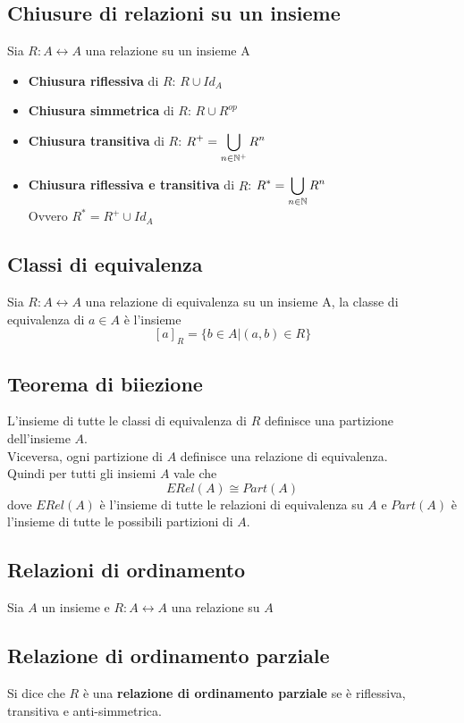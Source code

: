 \documentclass{article}
\begin{document}
\subsection*{Chiusure di relazioni su un insieme}
Sia \(R: A \leftrightarrow A\) una relazione su un insieme A
\begin{itemize}
    \item \textbf{Chiusura riflessiva} di \(R\): \(R \cup Id_A\)
    \item \textbf{Chiusura simmetrica} di \(R\): \(R \cup R^{op}\)
    \item \textbf{Chiusura transitiva} di \(R\): \(\displaystyle R^+ = \bigcup_{n \in \mathbb{N}^+} R^n\)
    \item \textbf{Chiusura riflessiva e transitiva} di \(R\): \(\displaystyle R^* = \bigcup_{n \in \mathbb{N}} R^n\) \\
          Ovvero \(R^* = R^+ \cup Id_A\)
\end{itemize}
\subsection*{Classi di equivalenza}
Sia \(R: A \leftrightarrow A\) una relazione di equivalenza su un insieme A, la classe di equivalenza di \(a \in A\) è l'insieme
\[[a]_R = \{b \in A \vert (a,b) \in R\}\]
\subsection*{Teorema di biiezione}
L'insieme di tutte le classi di equivalenza di \(R\) definisce una partizione dell'insieme \(A\). \\
Viceversa, ogni partizione di \(A\) definisce una relazione di equivalenza.\\
Quindi per tutti gli insiemi \(A\) vale che
\[ERel(A) \cong Part(A)\]
dove \(ERel(A)\) è l'insieme di tutte le relazioni di equivalenza su \(A\) e \(Part(A)\) è l'insieme di tutte le possibili partizioni di \(A\).

\subsection{Relazioni di ordinamento}
Sia \(A\) un insieme e \(R: A \leftrightarrow A\) una relazione su \(A\)
\subsection*{Relazione di ordinamento parziale}
Si dice che \(R\) è una \textbf{relazione di ordinamento parziale} se è riflessiva, transitiva e anti-simmetrica.
\end{document}
